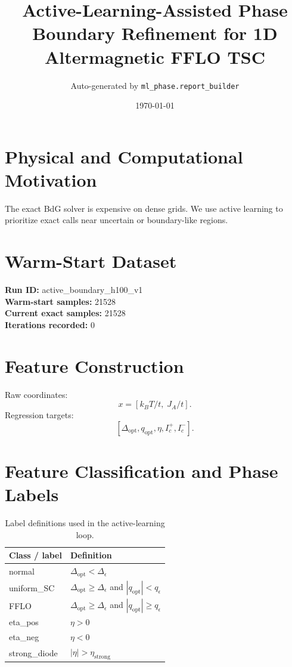 \documentclass[11pt]{article}
\title{Active-Learning-Assisted Phase Boundary Refinement for 1D Altermagnetic FFLO TSC}
\author{Auto-generated by \texttt{ml\_phase.report\_builder}}
\date{\today}
\begin{document}
\maketitle

\section{Physical and Computational Motivation}
The exact BdG solver is expensive on dense grids. We use active learning to prioritize exact calls near uncertain or boundary-like regions.

\section{Warm-Start Dataset}
\textbf{Run ID:} active\_boundary\_h100\_v1\\
\textbf{Warm-start samples:} 21528\\
\textbf{Current exact samples:} 21528\\
\textbf{Iterations recorded:} 0

\section{Feature Construction}
Raw coordinates:
\[
x = [k_B T / t,\; J_A/t].
\]
Regression targets:
\[
[\Delta_{\mathrm{opt}}, q_{\mathrm{opt}}, \eta, I_c^+, I_c^-].
\]

\section{Feature Classification and Phase Labels}
\begin{table}[H]
\centering
\begin{tabular}{ll}
\toprule
Class / label & Definition \\
\midrule
normal & $\Delta_{\mathrm{opt}} < \Delta_{\epsilon}$ \\
uniform\_SC & $\Delta_{\mathrm{opt}} \ge \Delta_{\epsilon}$ and $|q_{\mathrm{opt}}| < q_{\epsilon}$ \\
FFLO & $\Delta_{\mathrm{opt}} \ge \Delta_{\epsilon}$ and $|q_{\mathrm{opt}}| \ge q_{\epsilon}$ \\
eta\_pos & $\eta > 0$ \\
eta\_neg & $\eta < 0$ \\
strong\_diode & $|\eta| > \eta_{\mathrm{strong}}$ \\
\bottomrule
\end{tabular}
\caption{Label definitions used in the active-learning loop.}
\end{table}
\end{document}
